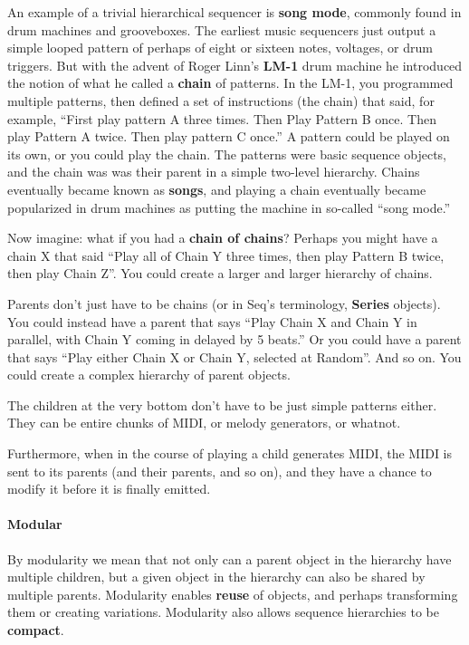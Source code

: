 \documentclass[twoside,10pt]{article}
\begin{document}
An example of a trivial hierarchical sequencer is {\bf song mode}, commonly found in drum machines and grooveboxes.  The earliest music sequencers just output a simple looped pattern of perhaps of eight or sixteen notes, voltages, or drum triggers.  But with the advent of Roger Linn's {\bf LM-1} drum machine he introduced the notion of what he called a {\bf chain} of patterns.  In the LM-1, you programmed multiple patterns, then defined a set of instructions (the chain) that said, for example, ``First play pattern A three times. Then Play Pattern B once.  Then play Pattern A twice.  Then play pattern C once.''   A pattern could be played on its own, or you could play the chain.  The patterns were basic sequence objects, and the chain was was their parent in a simple two-level hierarchy.   Chains eventually became known as {\bf songs}, and playing a chain eventually became popularized in drum machines as putting the machine in so-called ``song mode.''

Now imagine: what if you had a {\bf chain of chains}?  Perhaps you might have a chain X that said ``Play all of Chain Y three times, then play Pattern B twice, then play Chain Z''.  You could create a larger and larger hierarchy of chains.

Parents don't just have to be chains (or in Seq's terminology, {\bf Series} objects).  You could instead have a parent that says ``Play Chain X and Chain Y in parallel, with Chain Y coming in delayed by 5 beats.''  Or you could have a parent that says ``Play either Chain X or Chain Y, selected at Random''.  And so on.  You could create a complex hierarchy of parent objects.

The children at the very bottom don't have to be just simple patterns either.  They can be entire chunks of MIDI, or melody generators, or whatnot.  

Furthermore, when in the course of playing a child generates MIDI, the MIDI is sent to its parents (and their parents, and so on), and they have a chance to modify it before it is finally emitted.

\paragraph{Modular} By modularity we mean that not only can a parent object in the hierarchy have multiple children, but a given object in the hierarchy can also be shared by multiple parents.  Modularity enables {\bf reuse} of objects, and perhaps transforming them or creating variations.   Modularity also allows sequence hierarchies to be {\bf compact}.
\end{document}
